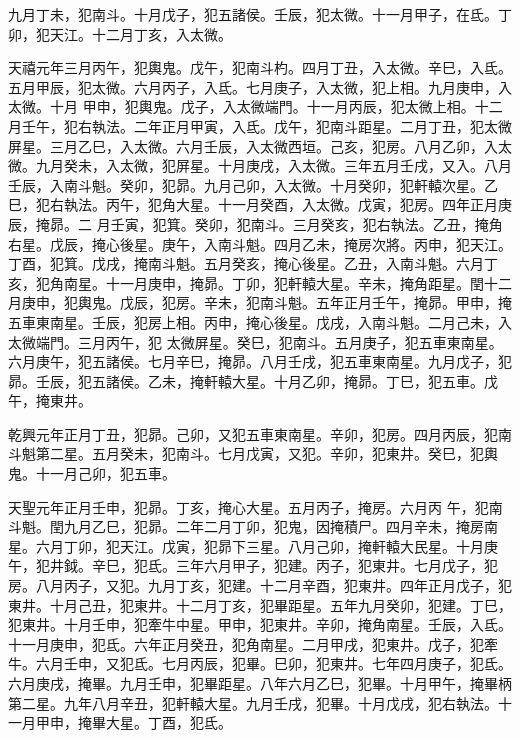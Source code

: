 \begin{pinyinscope}
 九月丁未，犯南斗。十月戊子，犯五諸侯。壬辰，犯太微。十一月甲子，在氐。丁卯，犯天江。十二月丁亥，入太微。



 天禧元年三月丙午，犯輿鬼。戊午，犯南斗杓。四月丁丑，入太微。辛巳，入氐。五月甲辰，犯太微。六月丙子，入氐。七月庚子，入太微，犯上相。九月庚申，入太微。十月
 甲申，犯輿鬼。戊子，入太微端門。十一月丙辰，犯太微上相。十二月壬午，犯右執法。二年正月甲寅，入氐。戊午，犯南斗距星。二月丁丑，犯太微屏星。三月乙巳，入太微。六月壬辰，入太微西垣。己亥，犯房。八月乙卯，入太微。九月癸未，入太微，犯屏星。十月庚戌，入太微。三年五月壬戌，又入。八月壬辰，入南斗魁。癸卯，犯昴。九月己卯，入太微。十月癸卯，犯軒轅次星。乙巳，犯右執法。丙午，犯角大星。十一月癸酉，入太微。戊寅，犯房。四年正月庚辰，掩昴。二
 月壬寅，犯箕。癸卯，犯南斗。三月癸亥，犯右執法。乙丑，掩角右星。戊辰，掩心後星。庚午，入南斗魁。四月乙未，掩房次將。丙申，犯天江。丁酉，犯箕。戊戌，掩南斗魁。五月癸亥，掩心後星。乙丑，入南斗魁。六月丁亥，犯角南星。十一月庚申，掩昴。丁卯，犯軒轅大星。辛未，掩角距星。閏十二月庚申，犯輿鬼。戊辰，犯房。辛未，犯南斗魁。五年正月壬午，掩昴。甲申，掩五車東南星。壬辰，犯房上相。丙申，掩心後星。戊戌，入南斗魁。二月己未，入太微端門。三月丙午，犯
 太微屏星。癸巳，犯南斗。五月庚子，犯五車東南星。六月庚午，犯五諸侯。七月辛巳，掩昴。八月壬戌，犯五車東南星。九月戊子，犯昴。壬辰，犯五諸侯。乙未，掩軒轅大星。十月乙卯，掩昴。丁巳，犯五車。戊午，掩東井。



 乾興元年正月丁丑，犯昴。己卯，又犯五車東南星。辛卯，犯房。四月丙辰，犯南斗魁第二星。五月癸未，犯南斗。七月戊寅，又犯。辛卯，犯東井。癸巳，犯輿鬼。十一月己卯，犯五車。



 天聖元年正月壬申，犯昴。丁亥，掩心大星。五月丙子，掩房。六月丙
 午，犯南斗魁。閏九月乙巳，犯昴。二年二月丁卯，犯鬼，因掩積尸。四月辛未，掩房南星。六月丁卯，犯天江。戊寅，犯昴下三星。八月己卯，掩軒轅大民星。十月庚午，犯井鉞。辛巳，犯氐。三年六月甲子，犯建。丙子，犯東井。七月戊子，犯房。八月丙子，又犯。九月丁亥，犯建。十二月辛酉，犯東井。四年正月戊子，犯東井。十月己丑，犯東井。十二月丁亥，犯畢距星。五年九月癸卯，犯建。丁巳，犯東井。十月壬申，犯牽牛中星。甲申，犯東井。辛卯，掩角南星。壬辰，入氐。
 十一月庚申，犯氐。六年正月癸丑，犯角南星。二月甲戌，犯東井。戊子，犯牽牛。六月壬申，又犯氐。七月丙辰，犯畢。巳卯，犯東井。七年四月庚子，犯氐。六月庚戌，掩畢。九月壬申，犯畢距星。八年六月乙巳，犯畢。十月甲午，掩畢柄第二星。九年八月辛丑，犯軒轅大星。九月壬戌，犯畢。十月戊戌，犯右執法。十一月甲申，掩畢大星。丁酉，犯氐。




\end{pinyinscope}
